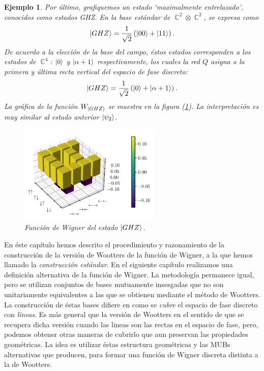 \documentclass[a4paper]{report}
\DeclareMathOperator{\C}{\mathbb{C}}
\newtheorem{example}{Ejemplo}
\begin{document}
\begin{example}
    Por último, grafiquemos un estado `maximalmente
    entrelazado', conocidos como estados GHZ. En la base
    estándar de $\C^2 \otimes \C^2$, se expresa como
    \[
      \ket{GHZ}
      = \frac{1}{\sqrt{2}} \left( \ket{00} + \ket{11}
      \right). 
    \] 
    De acuerdo a la elección de la base del campo, éstos
    estados corresponden a los estados de $\C^{4}$: $\ket{0}$
    y $\ket{\alpha+1}$ respectivamente, los cuales la red
    $Q$ asigna a la primera y última recta vertical del
    espacio de fase discreto:
    \[
      \ket{GHZ}
      = \frac{1}{\sqrt{2}}
      \left( \ket{0} + \ket{\alpha+1} \right). 
    \] 
    La gráfica de la función $W_{\ket{GHZ}}$ se muestra en
    la figura (\ref{fig:wigner-desargues-2-2-ghz}). La
    interpretación es muy similar al estado anterior
    $\ket{\psi_2}$.
    \begin{figure}[ht]
      \centering
      \includegraphics[width=0.6\textwidth]{
      imgs/wigner-desargues-2-2-ghz.png}
      \caption{Función de Wigner del estado $\ket{GHZ}$.}
      \label{fig:wigner-desargues-2-2-ghz}
    \end{figure}
  \end{example}

  En éste capítulo hemos descrito el procedimiento y
  razonamiento de la construcción de la versión de Wootters
  de la función de Wigner, a la que hemos llamado la
  \textit{construcción estándar}. En el siguiente capítulo
  realizamos una definición alternativa de la función de
  Wigner. La metodología permanece igual, pero se utilizan
  conjuntos de bases mutuamente insesgadas que no son
  unitariamente equivalentes a las que se obtienen mediante
  el método de Wootters. La construcción de éstas bases
  difiere en como se \textit{cubre} el espacio de fase
  discreto con \textit{lineas}. Es más general que la
  versión de Wootters en el sentido de que se recupera dicha
  versión cuando las lineas son las rectas en el espacio de
  fase, pero, podemos obtener otras maneras de cubrirlo que
  aun preservan las propiedades geométricas. La idea es
  utilizar éstas estructura geométricas y las MUBs
  alternativas que producen, para formar una función de
  Wigner discreta distinta a la de Wootters.
\end{document}
